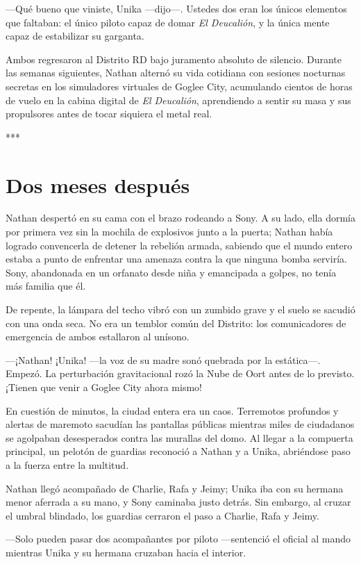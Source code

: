 \documentclass[12pt,a4paper]{book}
\begin{document}
---Qué bueno que viniste, Unika ---dijo---. Ustedes dos eran los únicos elementos que faltaban: el único piloto capaz de domar \textit{El Deucalión}, y la única mente capaz de estabilizar su garganta.

Ambos regresaron al Distrito RD bajo juramento absoluto de silencio. Durante las semanas siguientes, Nathan alternó su vida cotidiana con sesiones nocturnas secretas en los simuladores virtuales de Goglee City, acumulando cientos de horas de vuelo en la cabina digital de \textit{El Deucalión}, aprendiendo a sentir su masa y sus propulsores antes de tocar siquiera el metal real.

***

\section*{Dos meses después}

Nathan despertó en su cama con el brazo rodeando a Sony. A su lado, ella dormía por primera vez sin la mochila de explosivos junto a la puerta; Nathan había logrado convencerla de detener la rebelión armada, sabiendo que el mundo entero estaba a punto de enfrentar una amenaza contra la que ninguna bomba serviría. Sony, abandonada en un orfanato desde niña y emancipada a golpes, no tenía más familia que él.

De repente, la lámpara del techo vibró con un zumbido grave y el suelo se sacudió con una onda seca. No era un temblor común del Distrito: los comunicadores de emergencia de ambos estallaron al unísono.

---¡Nathan! ¡Unika! ---la voz de su madre sonó quebrada por la estática---. Empezó. La perturbación gravitacional rozó la Nube de Oort antes de lo previsto. ¡Tienen que venir a Goglee City ahora mismo!

En cuestión de minutos, la ciudad entera era un caos. Terremotos profundos y alertas de maremoto sacudían las pantallas públicas mientras miles de ciudadanos se agolpaban desesperados contra las murallas del domo. Al llegar a la compuerta principal, un pelotón de guardias reconoció a Nathan y a Unika, abriéndose paso a la fuerza entre la multitud.

Nathan llegó acompañado de Charlie, Rafa y Jeimy; Unika iba con su hermana menor aferrada a su mano, y Sony caminaba justo detrás. Sin embargo, al cruzar el umbral blindado, los guardias cerraron el paso a Charlie, Rafa y Jeimy.

---Solo pueden pasar dos acompañantes por piloto ---sentenció el oficial al mando mientras Unika y su hermana cruzaban hacia el interior.
\end{document}
